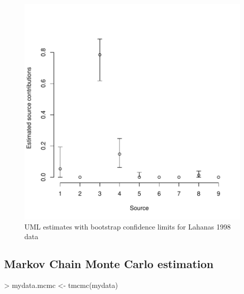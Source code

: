 \documentclass[11pt]{article}
\begin{document}
\begin{figure}
\includegraphics{mixstock-022}
\caption{UML estimates with bootstrap confidence limits for Lahanas 1998 data}
\label{fig:umlboot}
\end{figure}

\subsection{Markov Chain Monte Carlo estimation}
\begin{Schunk}
\begin{Sinput}
> mydata.mcmc <- tmcmc(mydata)
\end{Sinput}
\end{Schunk}
\end{document}
